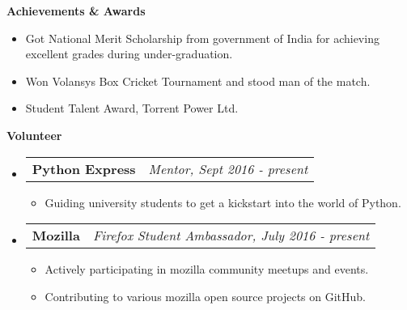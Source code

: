 \documentclass[letterpaper,10pt]{article}
\makeatletter
\newcommand{\resitem}[1]{\item #1 \vspace{-2pt}}
\newcommand{\resheading}[1]{{\large \colorbox{mygrey}{\begin{minipage}{\textwidth}{\textbf{#1 \vphantom{p\^{E}}}}\end{minipage}}}}
\newcommand{\ressubheading}[4]{
\begin{tabular*}{7.0in}{l@{\extracolsep{\fill}}r}
		\textbf{#1} & \textit{#4} \\
\end{tabular*}\vspace{-6pt}}
\makeatother
\begin{document}
\resheading{Achievements \& Awards}
\begin{itemize}
	\item Got National Merit Scholarship from government of India for achieving excellent grades during under-graduation.
	\item Won Volansys Box Cricket Tournament and stood man of the match.
	\item Student Talent Award, Torrent Power Ltd.
\end{itemize}

\resheading{Volunteer}
\begin{itemize}

\item
	\ressubheading{Python Express}{Remote}{Mentor}{Mentor, Sept 2016 - present}
	\begin{itemize}
		\resitem{Guiding university students to get a kickstart into the world of Python.}
	\end{itemize}
	
\item
	\ressubheading{Mozilla}{Remote}{Firefox Student Ambassador}{Firefox Student Ambassador, July 2016 - present}
	\begin{itemize}
		\resitem{Actively participating in mozilla community meetups and events.}
		\resitem{Contributing to various mozilla open source projects on GitHub.}
	\end{itemize}
	
\end{itemize}
\end{document}
